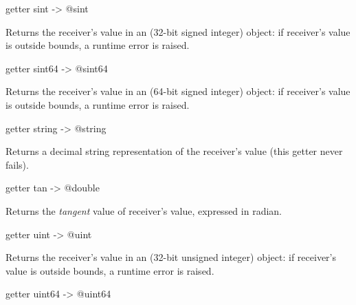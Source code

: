 
\begin{galgascode}
getter sint -> @sint
\end{galgascode}

Returns the receiver's value in an  (32-bit signed integer) object: if receiver's value is outside  bounds, a runtime error is raised.




\begin{galgascode}
getter sint64 -> @sint64
\end{galgascode}

Returns the receiver's value in an  (64-bit signed integer) object: if receiver's value is outside  bounds, a runtime error is raised.





\begin{galgascode}
getter string -> @string
\end{galgascode}

Returns a decimal string representation of the receiver's value (this getter never fails).





\begin{galgascode}
getter tan -> @double
\end{galgascode}

Returns the \emph{tangent} value of receiver's value, expressed in radian.








\begin{galgascode}
getter uint -> @uint
\end{galgascode}

Returns the receiver's value in an  (32-bit unsigned integer) object: if receiver's value is outside  bounds, a runtime error is raised.






\begin{galgascode}
getter uint64 -> @uint64
\end{galgascode}

